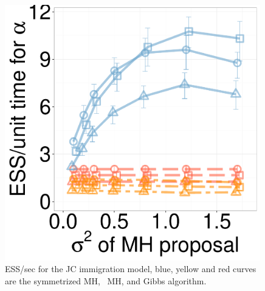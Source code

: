 	\begin{figure}	
  \centering
  \begin{minipage}[!hp]{0.25\linewidth}
  \centering
    \includegraphics [width=0.99\textwidth, angle=0]{figs/new_whole_exp_figs/jc_alpha.pdf}
  \end{minipage}
  \begin{minipage}[!hp]{0.74\linewidth}
    \caption{ESS/sec for the JC immigration model, blue, yellow and red curves are the symmetrized MH,
  \naive\ MH, and Gibbs algorithm.}
     \label{fig:ESS_pc_55}
  \end{minipage}


  \end{figure}

